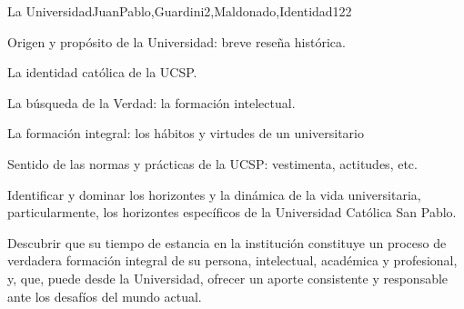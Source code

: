 \begin{syllabus}
\begin{unit}{La Universidad}{JuanPablo,Guardini2,Maldonado,Identidad}{12}{2}
\begin{topics}
	\item Origen y propósito de la Universidad: breve reseña histórica.
	\item La identidad católica de la UCSP.
	\item La búsqueda de la Verdad: la formación intelectual.
	\item La formación integral: los hábitos y virtudes de un universitario
	\item Sentido de las normas y prácticas de la UCSP: vestimenta, actitudes, etc.
\end{topics}
\begin{unitgoals}
	\item Identificar y dominar los horizontes y la dinámica de la vida universitaria, particularmente,  los horizontes específicos de la Universidad Católica San Pablo.
	\item Descubrir que su tiempo de estancia en la institución constituye un proceso de verdadera formación integral de su persona, intelectual, académica y profesional, y, que, puede desde la Universidad, ofrecer un aporte consistente y responsable ante los desafíos del mundo actual.   
\end{unitgoals}
\end{unit}



\begin{coursebibliography}
\end{coursebibliography}

\end{syllabus}
